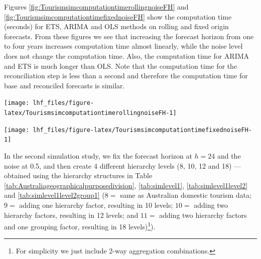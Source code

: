\documentclass[11pt,a4paper,]{article}
\let\origfigure\figure
\let\endorigfigure\endfigure
\renewenvironment{figure}[1][2] {
    \expandafter\origfigure\expandafter[!htbp]
} {
    \endorigfigure
}
\begin{document}
Figures \ref{fig:TourismsimcomputationtimerollingnoiseFH} and \ref{fig:TourismsimcomputationtimefixednoiseFH} show the computation time (seconds) for ETS, ARIMA and OLS methods on rolling and fixed origin forecasts. From these figures we see that increasing the forecast horizon from one to four years increases computation time almost linearly, while the noise level does not change the computation time. Also, the computation time for ARIMA and ETS is much longer than OLS. Note that the computation time for the reconciliation step is less than a second and therefore the computation time for base and reconciled forecasts is similar.

\begin{figure}

{\centering \texttt{[image: lhf\_files/figure-latex/TourismsimcomputationtimerollingnoiseFH-1]} 

}

\caption{Computation time (seconds) for ETS, ARIMA and OLS with and without reconciliation - Rolling  origin forecasts on one to four year test set and different error values - 304 bottom level series and 8 levels of hierarchy - Simulated tourism dataset.}\label{fig:TourismsimcomputationtimerollingnoiseFH}
\end{figure}

\begin{figure}

{\centering \texttt{[image: lhf\_files/figure-latex/TourismsimcomputationtimefixednoiseFH-1]} 

}

\caption{Computation time (seconds) for ETS, ARIMA and OLS with and without reconciliation - Fixed origin forecasts on one to four year test set and different error values - 304 bottom level series and 8 levels of hierarchy - Simulated tourism dataset.}\label{fig:TourismsimcomputationtimefixednoiseFH}
\end{figure}

In the second simulation study, we fix the forecast horizon at \(h=24\) and the noise at 0.5, and then create 4 different hierarchy levels (8, 10, 12 and 18) --- obtained using the hierarchy structures in Table \ref{tab:Australiageographicalpurposedivision}, \ref{tab:simlevel1}, \ref{tab:simlevel1level2} and \ref{tab:simlevel1level2group1} (\(8 =\) same as Australian domestic tourism data; \(9 =\) adding one hierarchy factor, resulting in 10 levels; \(10=\) adding two hierarchy factors, resulting in 12 levels; and \(11 =\) adding two hierarchy factors and one grouping factor, resulting in 18 levels)\footnote{For simplicity we just include 2-way aggregation combinations.}).
\end{document}
